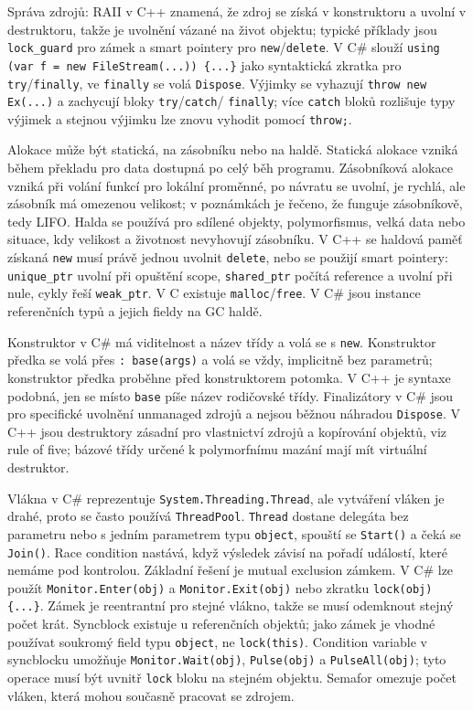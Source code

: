 \begin{odpoved}
Správa zdrojů: RAII v C++ znamená, že zdroj se získá v konstruktoru a uvolní v
destruktoru, takže je uvolnění vázané na život objektu; typické příklady jsou
\texttt{lock\_guard} pro zámek a smart pointery pro \texttt{new}/\texttt{delete}. V C\#
slouží \texttt{using (var f = new FileStream(...)) \{...\}} jako syntaktická zkratka pro
\texttt{try}/\texttt{finally}, ve \texttt{finally} se volá \texttt{Dispose}. Výjimky se
vyhazují \texttt{throw new Ex(...)} a zachycují bloky \texttt{try}/\texttt{catch}/
\texttt{finally}; více \texttt{catch} bloků rozlišuje typy výjimek a stejnou výjimku lze
znovu vyhodit pomocí \texttt{throw;}.

Alokace může být statická, na zásobníku nebo na haldě. Statická alokace vzniká během
překladu pro data dostupná po celý běh programu. Zásobníková alokace vzniká při volání
funkcí pro lokální proměnné, po návratu se uvolní, je rychlá, ale zásobník má omezenou
velikost; v poznámkách je řečeno, že funguje zásobníkově, tedy LIFO. Halda se používá
pro sdílené objekty, polymorfismus, velká data nebo situace, kdy velikost a životnost
nevyhovují zásobníku. V C++ se haldová paměť získaná \texttt{new} musí právě jednou
uvolnit \texttt{delete}, nebo se použijí smart pointery: \texttt{unique\_ptr} uvolní při
opuštění scope, \texttt{shared\_ptr} počítá reference a uvolní při nule, cykly řeší
\texttt{weak\_ptr}. V C existuje \texttt{malloc}/\texttt{free}. V C\# jsou instance
referenčních typů a jejich fieldy na GC haldě.

Konstruktor v C\# má viditelnost a název třídy a volá se s \texttt{new}. Konstruktor
předka se volá přes \texttt{: base(args)} a volá se vždy, implicitně bez parametrů;
konstruktor předka proběhne před konstruktorem potomka. V C++ je syntaxe podobná, jen
se místo \texttt{base} píše název rodičovské třídy. Finalizátory v C\# jsou pro specifické
uvolnění unmanaged zdrojů a nejsou běžnou náhradou \texttt{Dispose}. V C++ jsou
destruktory zásadní pro vlastnictví zdrojů a kopírování objektů, viz rule of five; bázové
třídy určené k polymorfnímu mazání mají mít virtuální destruktor.

Vlákna v C\# reprezentuje \texttt{System.Threading.Thread}, ale vytváření vláken je
drahé, proto se často používá \texttt{ThreadPool}. \texttt{Thread} dostane delegáta bez
parametru nebo s jedním parametrem typu \texttt{object}, spouští se \texttt{Start()} a
čeká se \texttt{Join()}. Race condition nastává, když výsledek závisí na pořadí událostí,
které nemáme pod kontrolou. Základní řešení je mutual exclusion zámkem. V C\# lze použít
\texttt{Monitor.Enter(obj)} a \texttt{Monitor.Exit(obj)} nebo zkratku
\texttt{lock(obj) \{...\}}. Zámek je reentrantní pro stejné vlákno, takže se musí
odemknout stejný počet krát. Syncblock existuje u referenčních objektů; jako zámek je
vhodné používat soukromý field typu \texttt{object}, ne \texttt{lock(this)}. Condition
variable v syncblocku umožňuje \texttt{Monitor.Wait(obj)}, \texttt{Pulse(obj)} a
\texttt{PulseAll(obj)}; tyto operace musí být uvnitř \texttt{lock} bloku na stejném
objektu. Semafor omezuje počet vláken, která mohou současně pracovat se zdrojem.


\end{odpoved}
